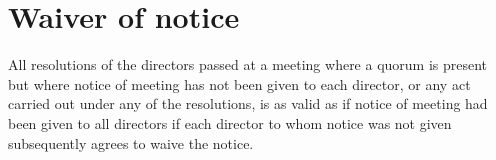 \section{Waiver of notice}

All resolutions of the directors passed at a meeting where a quorum is present but where notice of meeting has not been given to each director, or any act carried out under any of the resolutions, is as valid as if notice of meeting had been given to all directors if each director to whom notice was not given subsequently agrees to waive the notice. 
